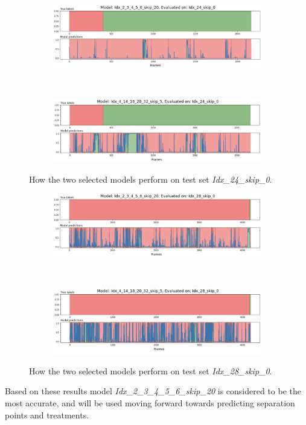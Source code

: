 \begin{figure}[H]
	\centering
	\begin{subfigure}{\linewidth}
		\centering
		\includegraphics[width=\linewidth]{Materials/Results/SP/M4On24C}
	\end{subfigure}
	\\
	\begin{subfigure}{\linewidth}
		\centering
		\includegraphics[width=\linewidth]{Materials/Results/SP/M6On24C}
	\end{subfigure}
	\caption{How the two selected models perform on test set \textit{Idx\_24\_skip\_0}.}
	\label{idx24}
\end{figure}

\begin{figure}[H]
	\centering
	\begin{subfigure}{\linewidth}
		\centering
		\includegraphics[width=\linewidth]{Materials/Results/SP/M4On28C}
	\end{subfigure}
	\\
	\begin{subfigure}{\linewidth}
		\centering
		\includegraphics[width=\linewidth]{Materials/Results/SP/M6On28C}
	\end{subfigure}
	\caption{How the two selected models perform on test set \textit{Idx\_28\_skip\_0}.}
	\label{idx28}
\end{figure}

Based on these results model \textit{Idx\_2\_3\_4\_5\_6\_skip\_20} is considered to be the most accurate, and will be used moving forward towards predicting separation points and treatments.